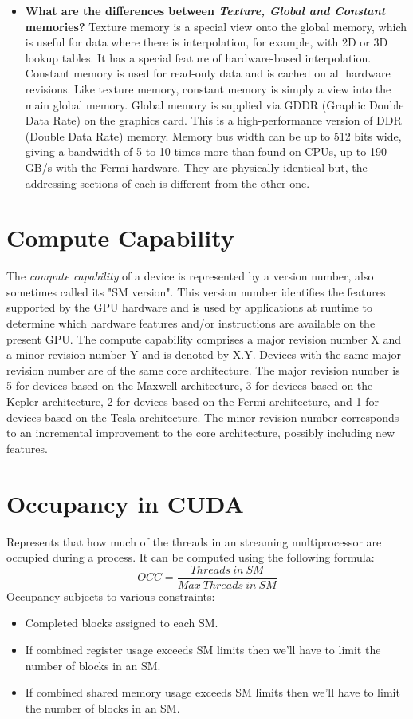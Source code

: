 \documentclass[12pt]{article}
\numberwithin{equation}{section}
\numberwithin{table}{section}
\numberwithin{figure}{section}
\begin{document}
\begin{itemize}
	\item \textbf{What are the differences between \textit{Texture, Global and Constant} memories?} Texture memory is a special view onto the global memory, which is useful for data where there is interpolation, for example, with 2D or 3D lookup tables. It has a special feature of
	hardware-based interpolation. Constant memory is used for read-only data and is cached on all
	hardware revisions. Like texture memory, constant memory is simply a view into the main global
	memory.
	Global memory is supplied via GDDR (Graphic Double Data Rate) on the graphics card. This is
	a high-performance version of DDR (Double Data Rate) memory. Memory bus width can be up to 512 bits
	wide, giving a bandwidth of 5 to 10 times more than found on CPUs, up to 190 GB/s with the Fermi
	hardware. They are physically identical but, the addressing sections of each is different from the other one.
\end{itemize}

\section{Compute Capability}
The \textit{compute capability} of a device is represented by a version number, also sometimes
called its "SM version". This version number identifies the features supported by the
GPU hardware and is used by applications at runtime to determine which hardware
features and/or instructions are available on the present GPU.
The compute capability comprises a major revision number X and a minor revision
number Y and is denoted by X.Y.
Devices with the same major revision number are of the same core architecture. The
major revision number is 5 for devices based on the Maxwell architecture, 3 for devices
based on the Kepler architecture, 2 for devices based on the Fermi architecture, and 1 for
devices based on the Tesla architecture.
The minor revision number corresponds to an incremental improvement to the core
architecture, possibly including new features.
\section{Occupancy in CUDA}
Represents that how much of the threads in an streaming multiprocessor are occupied during a process. It can be computed using the following formula:
\begin{equation}
	OCC = \frac{Threads\ in\ SM}{Max\ Threads\ in\ SM}
\end{equation}
Occupancy subjects to various constraints:
\begin{itemize}
	\item Completed blocks assigned to each SM.
	\item If combined register usage exceeds SM limits then we'll have to limit the number of blocks in an SM.
	\item If combined shared memory usage exceeds SM limits then we'll have to limit the number of blocks in an SM.
\end{itemize}
\end{document}
